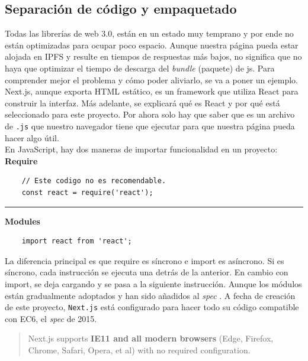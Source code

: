 \subsection{Separación de código y empaquetado}
Todas las librerías de web 3.0, están en un estado muy temprano y por ende no están optimizadas para ocupar poco espacio. Aunque nuestra página pueda estar alojada en IPFS y resulte en tiempos de respuestas más bajos, no significa que no haya que optimizar el tiempo de descarga del \textit{bundle} (paquete) de js. Para comprender mejor el problema y cómo poder aliviarlo, se va a poner un ejemplo. Next.js, aunque exporta HTML estático, es un framework que utiliza React para construir la interfaz. Más adelante, se explicará qué es React y por qué está seleccionado para este proyecto. Por ahora solo hay que saber que es un archivo de \verb|.js| que nuestro navegador tiene que ejecutar para que nuestra página pueda hacer algo útil.\\
En JavaScript, hay dos maneras de importar funcionalidad en un proyecto:\\
\textbf{Require}\\
\begin{lstlisting}
    // Este codigo no es recomendable.
    const react = require('react');
\end{lstlisting}
\noindent\rule{\textwidth}{0.4pt}
\textbf{Modules}\\
\begin{lstlisting}
    import react from 'react';
\end{lstlisting}
La diferencia principal es que require es síncrono e import es asíncrono.
Si es síncrono, cada instrucción se ejecuta una detrás de la anterior. En cambio con import, se deja cargando y se pasa a la siguiente instrucción.
Aunque los módulos están gradualmente adoptados \cite{web:canIuse} y han sido añadidos al \textit{spec} \cite{web:ecma}. A fecha de creación de este proyecto, \verb|Next.js| \cite{web:next.js} está configurado para hacer todo su código compatible con EC6, el \textit{spec} de 2015.
\begin{quote}
    Next.js supports \textbf{IE11 and all modern browsers} (Edge, Firefox, Chrome, Safari, Opera, et al) with no required configuration. \cite{web:next_supported}
\end{quote}
